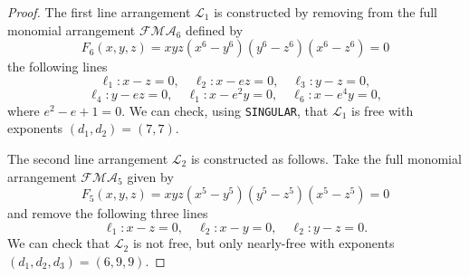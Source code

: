 \documentclass[10pt,a4paper]{amsart}
\begin{document}
\begin{proof}
The first line arrangement $\mathcal{L}_{1}$ is constructed by removing from the full monomial arrangement $\mathcal{FMA}_{6}$ defined by
$$F_{6}(x,y,z) = xyz(x^{6}-y^{6})(y^{6}-z^{6})(x^{6}-z^{6}) =0$$
the following lines
$$\ell_{1} : x-z=0, \quad \ell_{2} : x-ez=0, \quad \ell_{3} : y-z=0, $$
$$\ell_{4} : y-ez=0, \quad \ell_{1} : x-e^{2}y=0, \quad \ell_{6} : x-e^{4}y=0,$$
where $e^{2}-e+1=0$.
We can check, using \verb}SINGULAR}, that $\mathcal{L}_{1}$ is free with exponents $(d_{1},d_{2}) = (7,7)$. 

The second line arrangement $\mathcal{L}_{2}$ is constructed as follows. Take the full monomial arrangement $\mathcal{FMA}_{5}$ given by 
$$F_{5}(x,y,z) = xyz(x^{5}-y^{5})(y^{5}-z^{5})(x^{5}-z^{5}) =0$$
and remove the following three lines
$$\ell_{1} : x-z = 0, \quad \ell_{2} : x-y = 0, \quad \ell_{2} : y-z = 0.$$
We can check that $\mathcal{L}_{2}$ is not free, but only nearly-free with exponents $(d_{1},d_{2},d_{3}) = (6,9,9)$.
\end{proof}
\end{document}
